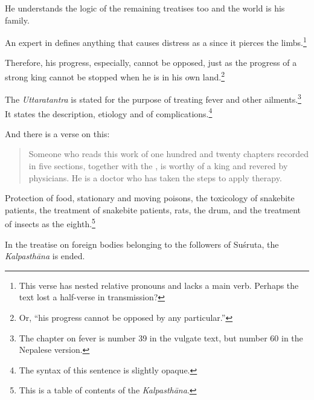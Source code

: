 \begin{translation}
\item[143 add 1]

He understands the logic of the remaining treatises too and the world is his 
family.

\item[143 add 2]

An expert in  defines anything that causes
distress as a  since it pierces the
limbs.\footnote{This verse has nested relative pronouns and lacks a
    main verb. Perhaps the text lost a half-verse in transmission?}

\item[143 add 3] 

Therefore, his progress, especially, cannot be opposed, just as the progress of a 
strong king cannot be stopped when he is in his own land.\footnote{Or, “his 
progress cannot be opposed by any particular.”}
 
\item[143 add 4]

The \emph{Uttaratantra} is stated for the purpose of treating fever
and other ailments.\footnote{The chapter on fever is number 39 in the
    vulgate text, but number 60 in the Nepalese version.} It states the
    description, etiology and  of
    complications.\footnote{The syntax of this sentence is slightly
        opaque.}

\item[143 add 5]

And there is a verse on this:

\begin{quote}
    Someone who reads this work of one hundred and twenty chapters
recorded in five sections, together with the
, is worthy of a king and revered by
physicians. He is a doctor who has taken the steps to apply
therapy.
\end{quote}

\item [143 add 6]

Protection of food, stationary and moving poisons, the toxicology of
snakebite patients, the treatment of snakebite patients, rats, the
drum, and the treatment of insects as the eighth.\footnote{This
    is a table of contents of the \emph{Kalpasthāna}.}

\bigskip


\begin{center}
    In the treatise on foreign bodies belonging to the followers of Suśruta, the 
\emph{Kalpasthāna} is ended.
\end{center} 

\end{translation}
